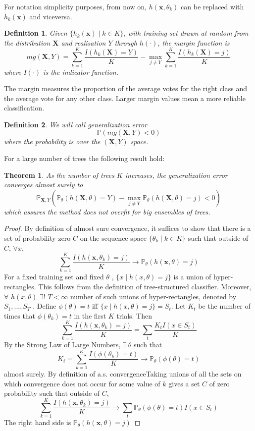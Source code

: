 \documentclass[a4paper,12pt]{article}
\newtheorem{definition}{Definition}[section]
\newtheorem{theorem}{Theorem}[section]
\begin{document}
For notation simplicity purposes, from now on, $h( \textbf{x},  \theta_{k}
)$ can be replaced with $h _{k}( \textbf{x} )$ and viceversa.
\begin{definition}
Given $\{h_{k} ( \textbf{x}) \mid k \in  \overline{K} \}$, with training
set drawn
at random from the distribution $\textbf{X}$ and realisation $Y$ through
$h(\cdot)$, the margin function is $$mg(\textbf{X},Y)= \sum_{k=1}^{K}
\frac{I(h_{k}(\textbf{X})=Y) }{K} - \max_{j \neq Y}
\sum_{k=1}^{K}\frac{I(h_{k}(\textbf{X})=j) }{K} $$
where $I (\cdot)$ is the indicator function.
\end{definition}
The margin measures the proportion of the average votes for the right
class and the average vote for any other class. Larger margin values mean
a more reliable classification. \\
\begin{definition}
We will call generalization error
$$\mathbb{P}(mg(\textbf{X}, Y)<0)$$
where the probability is over the $(\textbf{X}, Y)$ space.
\end{definition}
For a large number of trees the following result hold:
\begin{theorem}
As the number of trees $K$ increases, the generalization error converges
almost surely to
$$\mathbb{P}_{\textbf{X}, Y}(\mathbb{P}_{\theta}(h(\textbf{X}, \theta) =
Y)- \max_{j \neq Y} \mathbb{P}_{\theta}(h(\textbf{X}, \theta) = j) < 0)$$
which assures the method does not overfit for big ensembles of trees.
\end{theorem}

\begin{proof}
By definition of almost sure convergence, it suffices to show that there
is a set of probability zero $C$ on the sequence space  $\{\theta_{k} \mid
k \in K \}$ such that outside of $C$, $\forall x$,
$$ \sum_{k=1}^{K} \frac{I(h(\textbf{x},\theta_{k})= j) }{K} \rightarrow
\mathbb{P}_{\theta}(h(\textbf{x}, \theta) = j)$$
For a fixed training set and fixed $\theta$ , $\{x \mid h(x, \theta) = j
\}$ is a union of hyper-rectangles. This follows from the definition of
tree-structured classifier. Moreover, $\forall$  $h(x, \theta)$ $\exists
!$ $ T < \infty$ number of such unions of hyper-rectangles, denoted by
$S_{1},..., S_{T}$ . Define $\phi(\theta) = t$ iff $\{x \mid  h(x, \theta)
= j \} = S_{t}$. Let $K_{t}$ be the number of times that $\phi(\theta_{k})
= t$ in the first $K$ trials. Then
$$ \sum_{k=1}^{K} \frac{I(h(\textbf{x},\theta_{k})= j) }{K} = \sum_{t}
\frac{K_{t}I(x \in S_{t}) }{K}$$
By the Strong Law of Large Numbers, $\exists \ \theta$ such that
$$K_{t} = \sum_{k=1}^{K} \frac{I(\phi(\theta_{k})= t) }{K} \rightarrow
\mathbb{P}_{\theta}(\phi(\theta) = t)$$
almost surely. By definition of a.s. convergenceTaking unions of all the
sets on which convergence does not occur for some value of $k$ gives a set
$C$ of zero probability such that outside of $C$,
$$ \sum_{k=1}^{K} \frac{I(h(\textbf{x},\theta_{k})= j) }{K} \rightarrow
\sum_{t} \mathbb{P}_{\theta}(\phi(\theta) = t)I(x \in S_{t})$$
The right hand side is $\mathbb{P}_{\theta}(h(\textbf{x}, \theta) = j) $
\end{proof}
\end{document}
